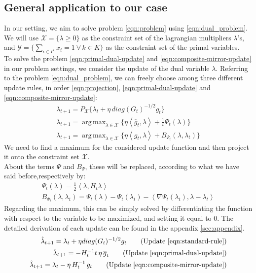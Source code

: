 \documentclass[notitlepage]{article}
\DeclareMathOperator*{\argmax}{arg\,max}
\begin{document}
\subsection{General application to our case}
In our setting, we aim to solve problem \eqref{eqn:problem} using \eqref{eqn:dual_problem}. We will use $\mathcal{X} = \{ \lambda \ge 0 \}$ as the constraint set of the lagrangian multipliers $\lambda$'s, and $\mathcal{Y} = \{ \sum_{i \in I^k} x_i = 1 \ \forall \, k \in K\}$ 
as the constraint set of the primal variables.\\
To solve the problem \eqref{eqn:primal-dual-update} and \eqref{eqn:composite-mirror-update} in our problem settings, we consider the update of the dual variable $\lambda$. Referring to the problem \eqref{eqn:dual_problem}, we can freely choose  
among three different update rules, in order \eqref{eqn:projection}, \eqref{eqn:primal-dual-update} and \eqref{eqn:composite-mirror-update}:
\begin{equation}
  \begin{gathered}
    \lambda_{t+1} = P_{\mathcal{X}} \{ \lambda_t + \eta\, diag(G_t)^{-1/2} g_t \} \\
    \lambda_{t+1} = \argmax_{\lambda \in \mathcal{X}} \{ \eta \left\langle \overline{g}_t,\lambda \right\rangle + \frac{1}{t} \Psi_t(\lambda) \} \\
    \lambda_{t+1} = \argmax_{\lambda \in \mathcal{X}} \{ \eta \left\langle g_t,\lambda \right\rangle + B_{\Psi_t} (\lambda,\lambda_t) \}
    \label{eqn:updates}  
  \end{gathered}
\end{equation}
We need to find a maximum for the considered update function and then project it onto the constraint set $\mathcal{X}$.\\
About the terms $\Psi$ and $B_\Psi$, these will be replaced, according to what we have said before,respectively by:
\begin{gather*}
  \Psi_t(\lambda) = \frac{1}{2} \left\langle \lambda,H_t \lambda \right\rangle \\
  B_{\Psi_t} (\lambda,\lambda_t) = \Psi_t(\lambda) - \Psi_t(\lambda_t) - \left\langle \nabla \Psi_t(\lambda_t),\lambda-\lambda_t \right\rangle
\end{gather*}
Regarding the maximum, this can be simply solved by differentiating the function with respect to the variable to be maximized, and setting it equal to $0$. The detailed derivation of each update can be found in the appendix \ref{sec:appendix}.
\begin{subequations}
  \label{eqn:minimized}
  \begin{align}
    \hat{\lambda}_{t+1} = \lambda_t + \eta diag(G_t)^{-1/2} g_t 
    \tag{Update \eqref{eqn:standard-rule}} \\
    \hat{\lambda}_{t+1} = -H_t^{-1} t\, \eta\, \overline{g}_t
    \tag{Update \eqref{eqn:primal-dual-update}} \\
    \hat{\lambda}_{t+1} = \lambda_t - \eta\, H_t^{-1}\, g_t 
    \tag{Update \eqref{eqn:composite-mirror-update}}
  \end{align}
\end{subequations}
\end{document}

